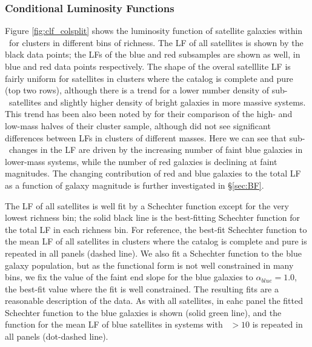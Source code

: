 \documentclass{emulateapj}
\begin{document}
\subsubsection{Conditional Luminosity Functions}\label{sec:CLF}
Figure \ref{fig:clf_colsplit} shows the luminosity function of
satellite galaxies within \rtwo\ for clusters in different bins of
richness. The LF of all satellites is shown by the black data points;
the LFs of the blue and red subsamples are shown as well, in blue and
red data points respectively.  The shape of the overal satelllite LF is fairly uniform for satellites in clusters where
the catalog is complete and pure (top two rows), although there is a trend for a lower number density of sub-\Lstar\ satellites and slightly higher density of bright galaxies in more massive systems.  This trend has been also been noted by \citet{LMS04} for their comparison of the high- and low-mass halves of their cluster sample, although \citep{depropris03} did not see significant differences between LFs in clusters of different masses. Here we can see that sub-\Lstar\ changes in the LF are driven by the increasing number of faint blue galaxies in lower-mass systems, while the number of red galaxies is declining at faint magnitudes. The changing contribution of red and blue galaxies to the total LF as a
function of galaxy magnitude is further investigated in \S \ref{sec:BF}. 

The LF of all satellites is well fit by
a Schechter function except for the very lowest richness bin; the solid
black line is the best-fitting Schechter function for the total LF in
each richness bin. For reference, the best-fit Schechter function to the mean LF of all satellites in
clusters where the catalog is complete and pure is repeated in all panels (dashed line). We also fit a Schechter function to the blue galaxy population, but as the functional form is not well constrained in many bins, we fix the value of the faint end slope for the blue galaxies to $\alpha_{blue} = 1.0$, the best-fit value where the fit is well constrained. The resulting fits are a reasonable description of the data. As with all satellites, in eahc panel the fitted Schechter function to the blue galaxies is shown (solid green line), and the function for the mean LF of blue satellites in systems with \Ntwo\ $> 10$ is repeated in all panels (dot-dashed line).

\begin{figure}
   
\end{figure}
\end{document}
